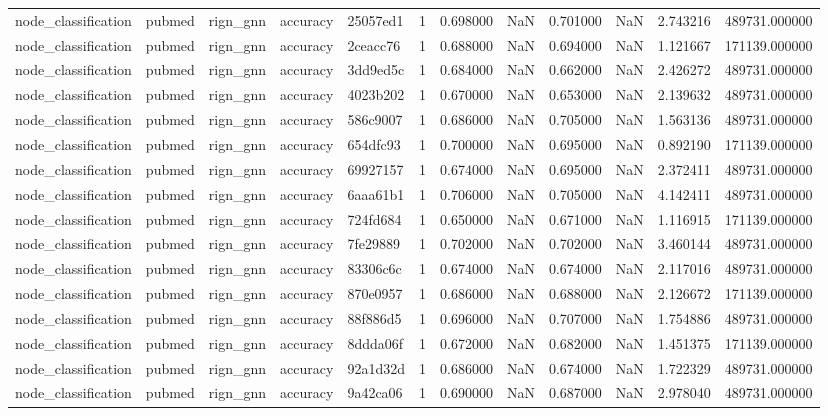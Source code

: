 \begin{tabular}{lllllrrrrrrr}
node_classification & pubmed & rign_gnn & accuracy & 25057ed1 & 1 & 0.698000 & NaN & 0.701000 & NaN & 2.743216 & 489731.000000 \\
node_classification & pubmed & rign_gnn & accuracy & 2ceacc76 & 1 & 0.688000 & NaN & 0.694000 & NaN & 1.121667 & 171139.000000 \\
node_classification & pubmed & rign_gnn & accuracy & 3dd9ed5c & 1 & 0.684000 & NaN & 0.662000 & NaN & 2.426272 & 489731.000000 \\
node_classification & pubmed & rign_gnn & accuracy & 4023b202 & 1 & 0.670000 & NaN & 0.653000 & NaN & 2.139632 & 489731.000000 \\
node_classification & pubmed & rign_gnn & accuracy & 586c9007 & 1 & 0.686000 & NaN & 0.705000 & NaN & 1.563136 & 489731.000000 \\
node_classification & pubmed & rign_gnn & accuracy & 654dfc93 & 1 & 0.700000 & NaN & 0.695000 & NaN & 0.892190 & 171139.000000 \\
node_classification & pubmed & rign_gnn & accuracy & 69927157 & 1 & 0.674000 & NaN & 0.695000 & NaN & 2.372411 & 489731.000000 \\
node_classification & pubmed & rign_gnn & accuracy & 6aaa61b1 & 1 & 0.706000 & NaN & 0.705000 & NaN & 4.142411 & 489731.000000 \\
node_classification & pubmed & rign_gnn & accuracy & 724fd684 & 1 & 0.650000 & NaN & 0.671000 & NaN & 1.116915 & 171139.000000 \\
node_classification & pubmed & rign_gnn & accuracy & 7fe29889 & 1 & 0.702000 & NaN & 0.702000 & NaN & 3.460144 & 489731.000000 \\
node_classification & pubmed & rign_gnn & accuracy & 83306c6c & 1 & 0.674000 & NaN & 0.674000 & NaN & 2.117016 & 489731.000000 \\
node_classification & pubmed & rign_gnn & accuracy & 870e0957 & 1 & 0.686000 & NaN & 0.688000 & NaN & 2.126672 & 171139.000000 \\
node_classification & pubmed & rign_gnn & accuracy & 88f886d5 & 1 & 0.696000 & NaN & 0.707000 & NaN & 1.754886 & 489731.000000 \\
node_classification & pubmed & rign_gnn & accuracy & 8ddda06f & 1 & 0.672000 & NaN & 0.682000 & NaN & 1.451375 & 171139.000000 \\
node_classification & pubmed & rign_gnn & accuracy & 92a1d32d & 1 & 0.686000 & NaN & 0.674000 & NaN & 1.722329 & 489731.000000 \\
node_classification & pubmed & rign_gnn & accuracy & 9a42ca06 & 1 & 0.690000 & NaN & 0.687000 & NaN & 2.978040 & 489731.000000 \\

\end{tabular}
